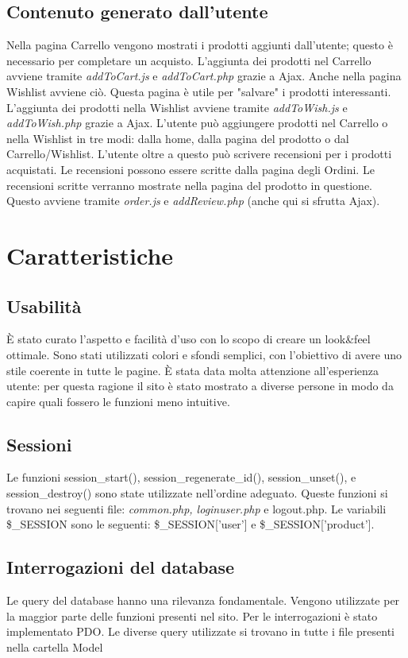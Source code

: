 \documentclass[14pt]{extarticle}
\begin{document}
\subsection{Contenuto generato dall'utente}
Nella pagina Carrello vengono mostrati i prodotti aggiunti dall'utente; questo è necessario per
completare un acquisto. L'aggiunta dei prodotti nel Carrello avviene tramite \textit{addToCart.js} e
\textit{addToCart.php} grazie a Ajax.
Anche nella pagina Wishlist avviene ciò. Questa pagina è utile per "salvare" i prodotti interessanti.
L'aggiunta dei prodotti nella Wishlist avviene tramite \textit{addToWish.js} e \textit{addToWish.php} grazie a
Ajax.
L'utente può aggiungere prodotti nel Carrello o nella Wishlist in tre modi: dalla home, dalla pagina
del prodotto o dal Carrello/Wishlist.
L'utente oltre a questo può scrivere recensioni per i prodotti acquistati. Le recensioni possono
essere scritte dalla pagina degli Ordini. Le recensioni scritte verranno mostrate nella pagina del
prodotto in questione. Questo avviene tramite \textit{order.js} e \textit{addReview.php} (anche qui si sfrutta
Ajax).



\section{Caratteristiche}
\subsection{Usabilità}
È stato curato l'aspetto e facilità d'uso con lo scopo di creare un look\&feel ottimale. Sono stati
utilizzati colori e sfondi semplici, con l'obiettivo di avere uno stile coerente in tutte le pagine. È
stata data molta attenzione all'esperienza utente: per questa ragione il sito è stato mostrato a
diverse persone in modo da capire quali fossero le funzioni meno intuitive.

\subsection{Sessioni}
Le funzioni session\_start(), session\_regenerate\_id(), session\_unset(), e
session\_destroy() sono state utilizzate nell'ordine adeguato. Queste funzioni si trovano nei
seguenti file: \textit{common.php, loginuser.php} e logout.php.
Le variabili \$\_SESSION sono le seguenti: \$\_SESSION['user'] e \$\_SESSION['product'].

\subsection{Interrogazioni del database}
Le query del database hanno una rilevanza fondamentale. Vengono utilizzate per la maggior parte
delle funzioni presenti nel sito. Per le interrogazioni è stato implementato PDO. Le diverse query
utilizzate si trovano in tutte i file presenti nella cartella Model
\end{document}
